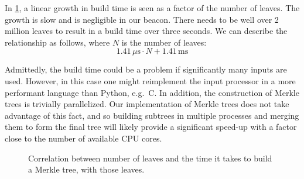 In \cref{fig:merkle_build}, a linear growth in build time is seen as a factor of the number of leaves.
The growth is slow and is negligible in our beacon.
There needs to be well over 2 million leaves to result in a build time over three seconds.
We can describe the relationship as follows, where $N$ is the number of leaves:
$$
1.41\,\mu\text{s} \cdot N + 1.41\,\text{ms}
$$

Admittedly, the build time could be a problem if significantly many inputs are used.
However, in this case one might reimplement the input processor in a more performant language than Python, e.g.\ C.
In addition, the construction of Merkle trees is trivially parallelized.
Our implementation of Merkle trees does not take advantage of this fact, and so building subtrees in multiple processes and merging them to form the final tree will likely provide a significant speed-up with a factor close to the number of available CPU cores.

\begin{figure}
    \centering\footnotesize
    \caption{Correlation between number of leaves and the time it takes to build a Merkle tree, with those leaves.}%
\label{fig:merkle_build}
\end{figure}

